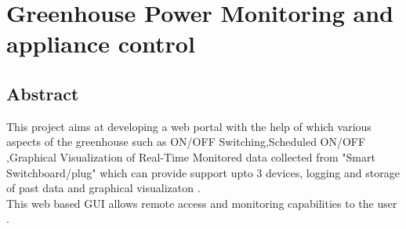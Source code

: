 \documentclass[a4paper,12pt,oneside]{book}
\begin{document}
\tableofcontents
\chapter[GREENHOUSE POWER MONITORING AND APPLIANCE CONTROL]{Greenhouse Power Monitoring and appliance control }
\section{Abstract}
\hspace{7mm}This project aims at developing a web portal with the help of which various aspects of the greenhouse such as ON/OFF Switching,Scheduled ON/OFF ,Graphical Visualization of Real-Time Monitored data collected from "Smart Switchboard/plug" which can provide support upto 3 devices, logging and storage of past data and graphical visualizaton .\\

This web based GUI allows remote access and monitoring capabilities to the user .\\

\newpage
\end{document}
